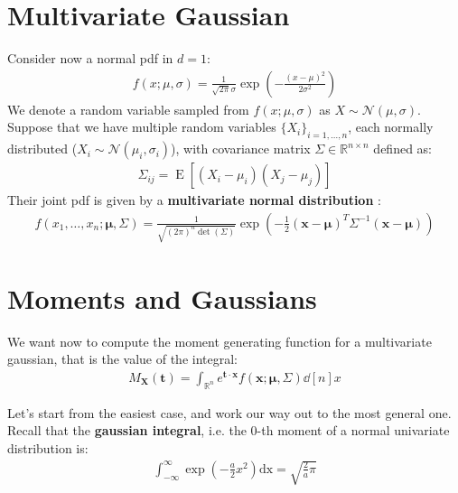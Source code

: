\documentclass[../template.tex]{subfiles}
\begin{document}
\section{Multivariate Gaussian}
Consider now a normal pdf in $d=1$:
\begin{align*}
    f(x;\mu,\sigma) = \frac{1}{\sqrt{2 \pi}\sigma} \exp\left(-\frac{(x-\mu)^2}{2\sigma^2} \right) 
\end{align*} 
We denote a random variable sampled from $f(x;\mu,\sigma)$ as $X \sim \mathcal{N}(\mu,\sigma)$.\\
Suppose that we have multiple random variables $\{X_i\}_{i=1,\dots,n}$, each normally distributed ($X_i \sim \mathcal{N}(\mu_i, \sigma_i)$), with covariance matrix $\Sigma \in \mathbb{R}^{n\times n}$ defined as:
\begin{align*}
    \Sigma_{ij} = \operatorname{E}[(X_i- \mu_i)(X_j - \mu_j)] 
\end{align*}
Their joint pdf is given by a \textbf{multivariate normal distribution} :
\begin{align*}
    f(x_1, \dots, x_n; \bm{\mu}, \Sigma) = \frac{1}{\sqrt{(2\pi)^n \operatorname{det}(\Sigma) }} \exp \left(-\frac{1}{2}(\bm{x}- \bm{\mu})^T \Sigma^{-1} (\bm{x} - \bm{\mu}) \right) 
\end{align*}

\section{Moments and Gaussians}
We want now to compute the moment generating function for a multivariate gaussian, that is the value of the integral:
\begin{align*}
    M_{\bm{X}}(\bm{t}) = \int_{\mathbb{R}^n} e^{\bm{t}\cdot \bm{x}} f(\bm{x};\bm{\mu},\Sigma) \dd[n]{x}
\end{align*} 

Let's start from the easiest case, and work our way out to the most general one.\\

Recall that the \textbf{gaussian integral}, i.e. the $0$-th moment of a normal univariate distribution is:
\begin{align*}
    \int_{-\infty}^{\infty} \exp\left(-\frac{a}{2}x^2 \right) \mathrm{dx} = \sqrt{\frac{2}{a} \pi } 
\end{align*}
\end{document}
